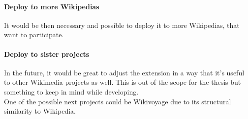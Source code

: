 \paragraph{Deploy to more Wikipedias}
It would be then necessary and possible to deploy it to more Wikipedias, that want to participate. 

\paragraph{Deploy to sister projects}
In the future, it would be great to adjust the extension in a way that it's useful to other Wikimedia projects as well. This is out of the scope for the thesis but something to keep in mind while developing. \\
One of the possible next projects could be Wikivoyage due to its structural similarity to Wikipedia.